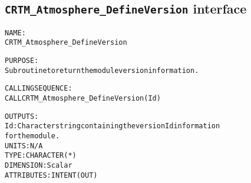 \subsection{\texttt{CRTM\_Atmosphere\_DefineVersion} interface}
  \label{sec:CRTM_Atmosphere_DefineVersion_interface}
  \begin{alltt}
 
  NAME:
        CRTM_Atmosphere_DefineVersion
 
  PURPOSE:
        Subroutine to return the module version information.
 
  CALLING SEQUENCE:
        CALL CRTM_Atmosphere_DefineVersion( Id )
 
  OUTPUTS:
        Id:            Character string containing the version Id information
                       for the module.
                       UNITS:      N/A
                       TYPE:       CHARACTER(*)
                       DIMENSION:  Scalar
                       ATTRIBUTES: INTENT(OUT)
 
  \end{alltt}
